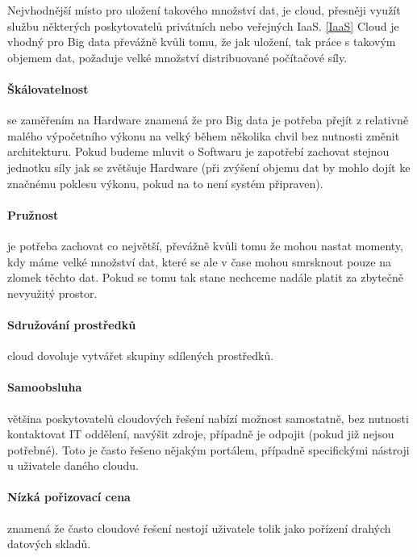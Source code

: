 Nejvhodnější místo pro uložení takového množství dat, je cloud, přesněji využít službu některých poskytovatelů privátních nebo veřejných IaaS. \ref{IaaS} Cloud je vhodný pro Big data převážně kvůli tomu, že jak uložení, tak práce s takovým objemem dat, požaduje velké množství distribuované počítačové síly. \cite{big-data-dummies}

\paragraph{Škálovatelnost} se zaměřením na Hardware znamená že pro Big data je potřeba přejít z relativně malého výpočetního výkonu na velký během několika chvil bez nutnosti změnit architekturu. Pokud budeme mluvit o Softwaru je zapotřebí zachovat stejnou jednotku síly jak se zvětšuje Hardware (při zvýšení objemu dat by mohlo dojít ke značnému poklesu výkonu, pokud na to není systém připraven). \cite{big-data-dummies}

\paragraph{Pružnost} je potřeba zachovat co největší, převážně kvůli tomu že mohou nastat momenty, kdy máme velké množství dat, které se ale v čase mohou smrsknout pouze na zlomek těchto dat. Pokud se tomu tak stane nechceme nadále platit za zbytečně nevyužitý prostor. \cite{big-data-dummies}

\paragraph{Sdružování prostředků} cloud dovoluje vytvářet skupiny sdílených prostředků. \cite{big-data-dummies}

\paragraph{Samoobsluha} většina poskytovatelů cloudových řešení nabízí možnost samostatně, bez nutnosti kontaktovat IT oddělení, navýšit zdroje, případně je odpojit (pokud již nejsou potřebné). Toto je často řešeno nějakým portálem, případně specifickými nástroji u uživatele daného cloudu. \cite{big-data-dummies}

\paragraph{Nízká pořizovací cena} znamená že často cloudové řešení nestojí uživatele tolik jako pořízení drahých datových skladů. \cite{big-data-dummies}

